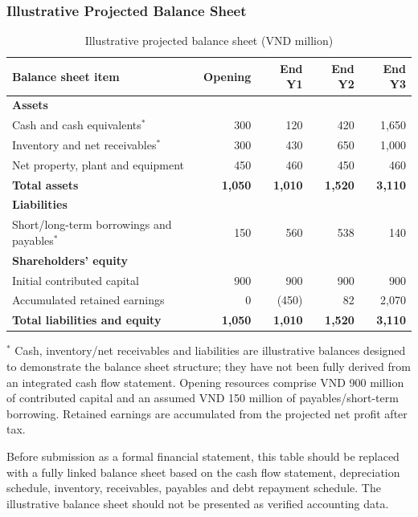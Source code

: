 \subsubsection{Illustrative Projected Balance Sheet}
\begin{table}[ht]
\centering\small
\caption{Illustrative projected balance sheet (VND million)}\label{tab:balance}
\begin{tabular}{@{}L{6.4cm}rrrr@{}}
  \toprule
  \textbf{Balance sheet item} & \textbf{Opening} & \textbf{End Y1} & \textbf{End Y2} & \textbf{End Y3}\\
  \midrule
  \textbf{Assets} & & & &\\
  \quad Cash and cash equivalents$^{*}$ & 300 & 120 & 420 & 1,650\\
  \quad Inventory and net receivables$^{*}$ & 300 & 430 & 650 & 1,000\\
  \quad Net property, plant and equipment & 450 & 460 & 450 & 460\\
  \textbf{Total assets} & \textbf{1,050} & \textbf{1,010} & \textbf{1,520} & \textbf{3,110}\\
  \midrule
  \textbf{Liabilities} & & & &\\
  \quad Short/long-term borrowings and payables$^{*}$ & 150 & 560 & 538 & 140\\
  \textbf{Shareholders' equity} & & & &\\
  \quad Initial contributed capital & 900 & 900 & 900 & 900\\
  \quad Accumulated retained earnings & 0 & (450) & 82 & 2,070\\
  \textbf{Total liabilities and equity} & \textbf{1,050} & \textbf{1,010} & \textbf{1,520} & \textbf{3,110}\\
  \bottomrule
\end{tabular}
\end{table}

{\small $^{*}$ Cash, inventory/net receivables and liabilities are illustrative
balances designed to demonstrate the balance sheet structure; they have not been
fully derived from an integrated cash flow statement. Opening resources comprise
VND 900 million of contributed capital and an assumed VND 150 million of
payables/short-term borrowing. Retained earnings are accumulated from the
projected net profit after tax.\par}

Before submission as a formal financial statement, this table should be replaced
with a fully linked balance sheet based on the cash flow statement, depreciation
schedule, inventory, receivables, payables and debt repayment schedule. The
illustrative balance sheet should not be presented as verified accounting data.

